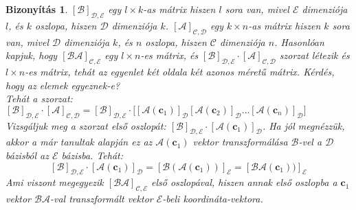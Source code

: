 \documentclass[a4paper,12pt,twoside]{book}
\newcommand{\ve}[2]{\mathbf{#1}_{#2}} %
\theoremstyle{break}
\newtheorem{bizNL}[biz]{Bizonyítás}
\begin{document}
\begin{bizNL}
$[\mathcal{B}]_{\mathcal{D},\mathcal{E}}$ egy $l\times k$-as mátrix hiszen $l$ sora van, mivel $\mathcal{E}$ dimenziója $l$, és $k$ oszlopa, hiszen $\mathcal{D}$ dimenziója $k$.
$[\mathcal{A}]_{\mathcal{C},\mathcal{D}}$ egy $k\times n$-as mátrix hiszen $k$ sora van, mivel $\mathcal{D}$ dimenziója $k$, és $n$ oszlopa, hiszen $\mathcal{C}$ dimenziója $n$. Hasonlóan kapjuk, hogy $[\mathcal{BA}]_{\mathcal{C},\mathcal{E}}$ egy $l\times n$-es mátrix, és $[\mathcal{B}]_{\mathcal{D},\mathcal{E}}\cdot [\mathcal{A}]_{\mathcal{C},\mathcal{D}}$ szorzat létezik és $l\times n$-es mátrix, tehát az egyenlet két oldala két azonos méretű mátrix. Kérdés, hogy az elemek egyeznek-e?\\

Tehát a szorzat: $[\mathcal{B}]_{\mathcal{D},\mathcal{E}}\cdot[\mathcal{A}]_{\mathcal{C},\mathcal{D}} = [\mathcal{B}]_{\mathcal{D},\mathcal{E}}\cdot\Big[[\mathcal{A}(\ve{c}{1})]_\mathcal{D}[\mathcal{A}(\ve{c}{2})]_\mathcal{D}\ldots[\mathcal{A}(\ve{c}{n})]_\mathcal{D}\Big]$\\

Vizsgáljuk meg a szorzat első oszlopát: $[\mathcal{B}]_{\mathcal{D},\mathcal{E}}\cdot[\mathcal{A}(\ve{c}{1})]_\mathcal{D}$. Ha jól megnézzük, akkor a már tanultak alapján ez az $\mathcal{A}(\ve{c}{1})$ vektor transzformálása $\mathcal{B}$-vel a $\mathcal{D}$ bázisból az $\mathcal{E}$ bázisba. Tehát:
\[[\mathcal{B}]_{\mathcal{D},\mathcal{E}}\cdot[\mathcal{A}(\ve{c}{1})]_\mathcal{D} = [\mathcal{B}(\mathcal{A}(\ve{c}{1}))]_{\mathcal{E}} = [\mathcal{BA}(\ve{c}{1}))]_{\mathcal{E}}\]
Ami viszont megegyezik $[\mathcal{BA}]_{\mathcal{C},\mathcal{E}}$ első oszlopával, hiszen annak első oszlopba a $\ve{c}{1}$ vektor $\mathcal{BA}$-val transzformált vektor $\mathcal{E}$-beli koordináta-vektora.\\


\end{bizNL}
\end{document}
